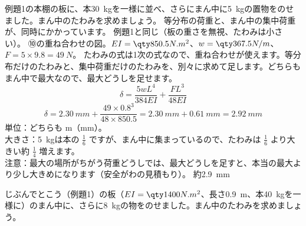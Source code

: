 \begin{phreidai}
\label{ph:力-10:ex10}例題1の本棚の板に、本\qty{30}{kg}を一様に並べ、さらにまん中に\qty{5}{kg}の置物をのせました。まん中のたわみを求めましょう。
\phbamen
等分布の荷重と、まん中の集中荷重が、同時にかかっています。
\phmushi
例題1と同じ（板の重さを無視、たわみは小さい）。
\phzu
⑩の重ね合わせの図。$EI=\pxkq{850.5}{N.m^2}$、$w=\pxkq{367.5}{N/m}$、$F=5\times9.8=\qty{49}{N}$。
\phriyu
たわみの式は1次の式なので、重ね合わせが使えます。等分布だけのたわみと、集中荷重だけのたわみを、別々に求めて足します。どちらもまん中で最大なので、最大どうしを足せます。
\phtateru
\[ \delta=\frac{5wL^4}{384EI}+\frac{FL^3}{48EI} \]
\phtoku
\[ \delta=\qty{2.30}{mm}+\frac{49\times0.8^3}{48\times850.5}=\qty{2.30}{mm}+\qty{0.61}{mm}=\qty{2.92}{mm} \]
\phtashikame
単位：どちらも m（mm）。\\
大きさ：\qty{5}{kg}は本の $\tfrac{1}{6}$ ですが、まん中に集まっているので、たわみは $\tfrac{1}{6}$ より大きい約 $\tfrac{1}{4}$ 増えます。\\
注意：最大の場所がちがう荷重どうしでは、最大どうしを足すと、本当の最大より少し大きめになります（安全がわの見積もり）。
\kotae 約\qty{2.9}{mm}
\end{phreidai}
\begin{jibun}
じぶんでとこう（例題1）の板（$EI=\pxkq{1400}{N.m^2}$、長さ\qty{0.9}{m}、本\qty{40}{kg}を一様に）のまん中に、さらに\qty{8}{kg}の物をのせました。まん中のたわみを求めましょう。
\end{jibun}

